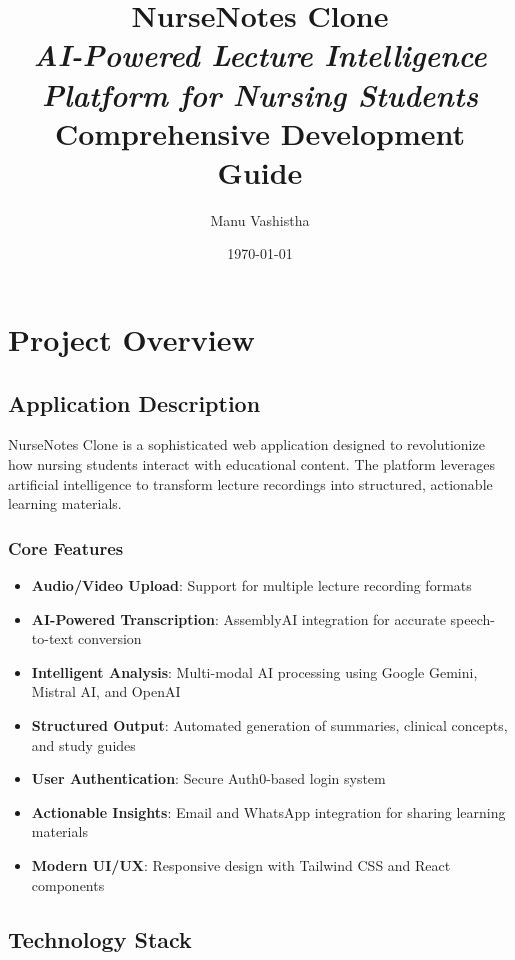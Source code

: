 \documentclass[12pt,a4paper]{article}
\title{\Huge\sffamily\textbf{NurseNotes Clone}\\[\baselineskip]
\large\textit{AI-Powered Lecture Intelligence Platform for Nursing Students}\\[2\baselineskip]
\large Comprehensive Development Guide}
\author{\sffamily Manu Vashistha}
\date{\today}
\begin{document}
\maketitle
\tableofcontents
\newpage

\section{Project Overview}

\subsection{Application Description}

NurseNotes Clone is a sophisticated web application designed to revolutionize how nursing students interact with educational content. The platform leverages artificial intelligence to transform lecture recordings into structured, actionable learning materials.

\subsubsection{Core Features}
\begin{itemize}
    \item \textbf{Audio/Video Upload}: Support for multiple lecture recording formats
    \item \textbf{AI-Powered Transcription}: AssemblyAI integration for accurate speech-to-text conversion
    \item \textbf{Intelligent Analysis}: Multi-modal AI processing using Google Gemini, Mistral AI, and OpenAI
    \item \textbf{Structured Output}: Automated generation of summaries, clinical concepts, and study guides
    \item \textbf{User Authentication}: Secure Auth0-based login system
    \item \textbf{Actionable Insights}: Email and WhatsApp integration for sharing learning materials
    \item \textbf{Modern UI/UX}: Responsive design with Tailwind CSS and React components
\end{itemize}

\subsection{Technology Stack}
\end{document}
